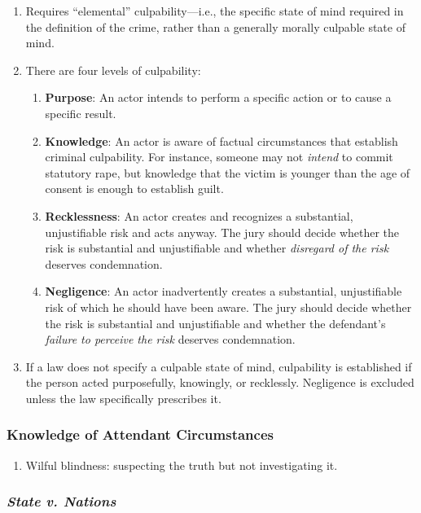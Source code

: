 \begin{enumerate}
    \item Requires ``elemental'' culpability---i.e., the specific state of mind required in the definition of the crime, rather than a generally morally culpable state of mind.
    \item There are four levels of culpability:
    \begin{enumerate}
        \item \textbf{Purpose}: An actor intends to perform a specific action or to cause a specific result.
        \item \textbf{Knowledge}: An actor is aware of factual circumstances that establish criminal culpability. For instance, someone may not \emph{intend} to commit statutory rape, but knowledge that the victim is younger than the age of consent is enough to establish guilt.
        \item \textbf{Recklessness}: An actor creates and recognizes a substantial, unjustifiable risk and acts anyway. The jury should decide whether the risk is substantial and unjustifiable and whether \emph{disregard of the risk} deserves condemnation. 
        \item \textbf{Negligence}: An actor inadvertently creates a substantial, unjustifiable risk of which he should have been aware. The jury should decide whether the risk is substantial and unjustifiable and whether the defendant's \emph{failure to perceive the risk} deserves condemnation.
    \end{enumerate}
    \item If a law does not specify a culpable state of mind, culpability is established if the person acted purposefully, knowingly, or recklessly. Negligence is excluded unless the law specifically prescribes it.
\end{enumerate}

\subsubsection{Knowledge of Attendant Circumstances}

\begin{enumerate}
    \item Wilful blindness: suspecting the truth but not investigating it.
\end{enumerate}

\subsubsection{\emph{State v. Nations}}

